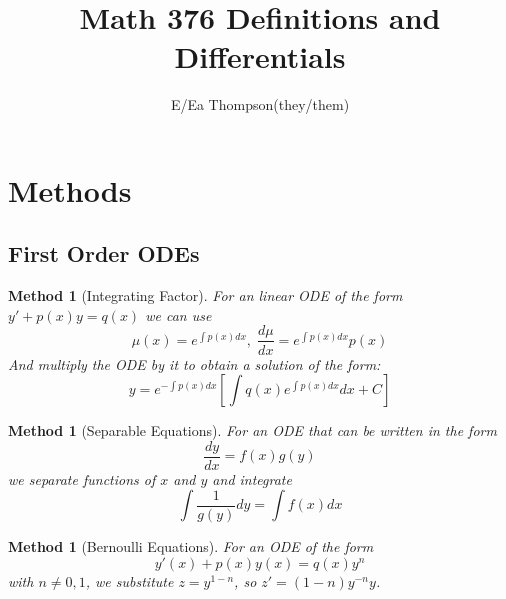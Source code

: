 \documentclass[12pt]{article}
\newtheorem{met}[thm]{Method}
\theoremstyle{definition}
\theoremstyle{remark}
\numberwithin{equation}{section}
\begin{document}

\title{Math 376 Definitions and Differentials}
\author{E/Ea Thompson(they/them)}
\maketitle

\tableofcontents


\clearpage

\section{Methods}

\subsection{First Order ODEs}

\begin{met}[Integrating Factor]
        For an linear ODE of the form $y'+p(x)y=q(x)$ we can use \begin{equation}
                \mu(x) = e^{\int p(x)dx},\;\frac{d\mu}{dx} = e^{\int p(x)dx}p(x)
        \end{equation}
        And multiply the ODE by it to obtain a solution of the form:    
        \begin{equation}
                y = e^{-\int p(x) dx}\left[\int q(x)e^{\int p(x)dx}dx + C \right]
        \end{equation}
\end{met}


\vspace{1cm}


\begin{met}[Separable Equations]
        For an ODE that can be written in the form \begin{equation}
                \frac{dy}{dx}=f(x)g(y)
        \end{equation}
        we separate functions of $x$ and $y$ and integrate \begin{equation}
                \int\frac{1}{g(y)}dy = \int f(x)dx
        \end{equation}
\end{met}


\vspace{1cm}


\begin{met}[Bernoulli Equations]
        For an ODE of the form\begin{equation}
                y'(x) + p(x)y(x) = q(x)y^n
        \end{equation}
        with $n \neq 0, 1$, we substitute $z = y^{1-n}$, so $z' =(1-n)y^{-n}y$.
\end{met}
\end{document}
